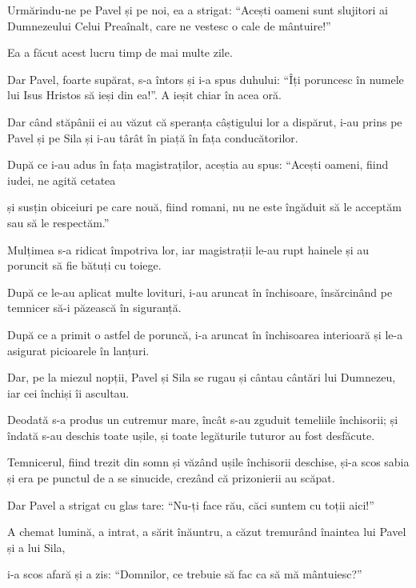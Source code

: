 {Urmărindu-ne pe Pavel și pe noi, ea a strigat: “Acești oameni sunt slujitori ai Dumnezeului Celui Preaînalt, care ne vestesc o cale de mântuire!”

Ea a făcut acest lucru timp de mai multe zile.

\par }{\PP Dar Pavel, foarte supărat, s-a întors și i-a spus duhului: “Îți poruncesc în numele lui Isus Hristos să ieși din ea!”. A ieșit chiar în acea oră.

Dar când stăpânii ei au văzut că speranța câștigului lor a dispărut, i-au prins pe Pavel și pe Sila și i-au târât în piață în fața conducătorilor.

După ce i-au adus în fața magistraților, aceștia au spus: “Acești oameni, fiind iudei, ne agită cetatea

și susțin obiceiuri pe care nouă, fiind romani, nu ne este îngăduit să le acceptăm sau să le respectăm.”


\par }{\PP {}Mulțimea s-a ridicat împotriva lor, iar magistrații le-au rupt hainele și au poruncit să fie bătuți cu toiege.

După ce le-au aplicat multe lovituri, i-au aruncat în închisoare, însărcinând pe temnicer să-i păzească în siguranță.

După ce a primit o astfel de poruncă, i-a aruncat în închisoarea interioară și le-a asigurat picioarele în lanțuri.


\par }{\PP {}Dar, pe la miezul nopții, Pavel și Sila se rugau și cântau cântări lui Dumnezeu, iar cei închiși îi ascultau.

Deodată s-a produs un cutremur mare, încât s-au zguduit temeliile închisorii; și îndată s-au deschis toate ușile, și toate legăturile tuturor au fost desfăcute.

Temnicerul, fiind trezit din somn și văzând ușile închisorii deschise, și-a scos sabia și era pe punctul de a se sinucide, crezând că prizonierii au scăpat.

Dar Pavel a strigat cu glas tare: “Nu-ți face rău, căci suntem cu toții aici!”


\par }{\PP {}A chemat lumină, a intrat, a sărit înăuntru, a căzut tremurând înaintea lui Pavel și a lui Sila,

i-a scos afară și a zis: “Domnilor, ce trebuie să fac ca să mă mântuiesc?”


}

